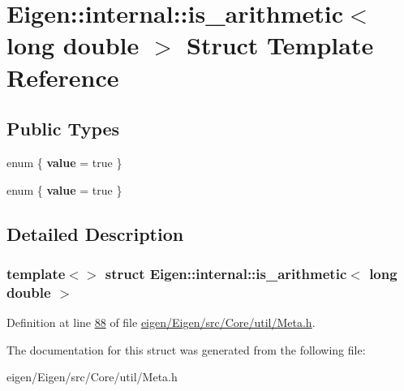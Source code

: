 \hypertarget{struct_eigen_1_1internal_1_1is__arithmetic_3_01long_01double_01_4}{}\section{Eigen\+:\+:internal\+:\+:is\+\_\+arithmetic$<$ long double $>$ Struct Template Reference}
\label{struct_eigen_1_1internal_1_1is__arithmetic_3_01long_01double_01_4}
\subsection*{Public Types}
\begin{DoxyCompactItemize}
\item 
\mbox{\label{struct_eigen_1_1internal_1_1is__arithmetic_3_01long_01double_01_4_a3fddb13207792c96fc2c6bb82012fcfb}} 
enum \{ {\bfseries value} = true
 \}
\item 
\mbox{\label{struct_eigen_1_1internal_1_1is__arithmetic_3_01long_01double_01_4_ac4df60ce9ae48065bcb5babad0d9e53c}} 
enum \{ {\bfseries value} = true
 \}
\end{DoxyCompactItemize}


\subsection{Detailed Description}
\subsubsection*{template$<$$>$\newline
struct Eigen\+::internal\+::is\+\_\+arithmetic$<$ long double $>$}



Definition at line \hyperlink{eigen_2_eigen_2src_2_core_2util_2_meta_8h_source_l00088}{88} of file \hyperlink{eigen_2_eigen_2src_2_core_2util_2_meta_8h_source}{eigen/\+Eigen/src/\+Core/util/\+Meta.\+h}.



The documentation for this struct was generated from the following file\+:\begin{DoxyCompactItemize}
\item 
eigen/\+Eigen/src/\+Core/util/\+Meta.\+h\end{DoxyCompactItemize}
